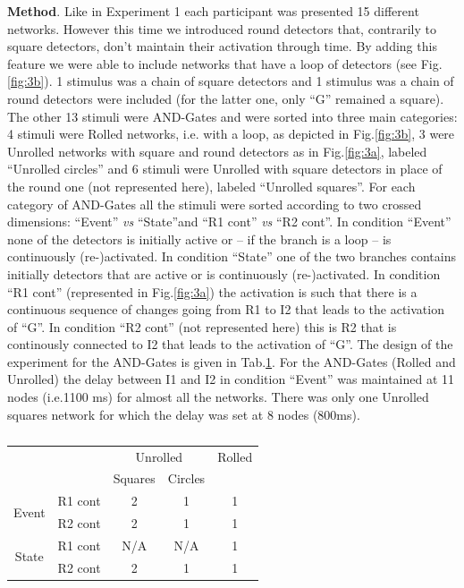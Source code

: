 \documentclass[10pt,letterpaper]{article}
\begin{document}
\textbf{Method}. Like in Experiment 1 each participant was presented 15 different networks. However this time we introduced round detectors that, contrarily to square detectors, don't maintain their activation through time. By adding this feature we were able to include networks that have a loop of detectors (see Fig.\ref{fig:3b}). 1 stimulus was a chain of square detectors and 1 stimulus was a chain of round detectors were included (for the latter one, only ``G'' remained a square). The other 13 stimuli were AND-Gates and were sorted into three main categories: 4 stimuli were Rolled networks, i.e. with a loop, as depicted in Fig.\ref{fig:3b}, 3 were Unrolled networks with square and round detectors as in Fig.\ref{fig:3a}, labeled ``Unrolled circles'' and 6 stimuli were Unrolled with square detectors in place of the round one (not represented here), labeled ``Unrolled squares''. For each category of AND-Gates all the stimuli were sorted according to two crossed dimensions: ``Event'' \textit{vs} ``State''and ``R1 cont'' \textit{vs} ``R2 cont''. In condition ``Event'' none of the detectors is initially active or -- if the branch is a loop -- is continuously (re-)activated. In condition ``State'' one of the two branches contains initially detectors that are active or is continuously (re-)activated. In condition ``R1 cont'' (represented in Fig.\ref{fig:3a}) the activation is such that there is a continuous sequence of changes going from R1 to I2 that leads to the activation of ``G''. In condition ``R2 cont'' (not represented here) this is R2 that is continously connected to I2 that leads to the activation of ``G''. The design of the experiment for the AND-Gates is given in Tab.\ref{tab:1}. For the AND-Gates (Rolled and Unrolled) the delay between I1 and I2 in condition ``Event'' was maintained at 11 nodes (i.e.1100 ms) for almost all the networks. There was only one Unrolled squares network for which the delay was set at 8 nodes (800ms).

\begin{table}[ht]
\begin{center} 
\vskip 0.12in
\begin{tabular}{c|c|c|c|c} 
\hline
\multicolumn{2}{c}{}&\multicolumn{2}{|c|}{Unrolled} & Rolled\\
\cline{3-5}
\multicolumn{2}{c|}{}& Squares    &  Circles & \\
\cline{1-4}
\multirow{2}{*}{Event} & R1 cont & 2 & 1 & 1\\
 & R2 cont & 2 & 1 & 1\\
\hline
\multirow{2}{*}{State} & R1 cont & N/A & N/A & 1\\
 & R2 cont & 2 & 1 & 1\\
\hline
\end{tabular} 
\end{center}
\caption{}
\label{tab:1}
\end{table}
\end{document}
